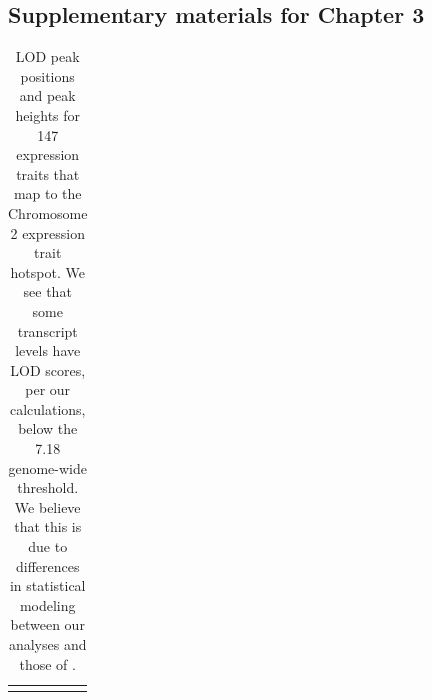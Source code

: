 \documentclass[oneside]{book}\usepackage[]{graphicx}\usepackage[]{color}
\begin{document}
\begin{appendices}
\chapter{Supplementary materials for Chapter 3}

{\small
\begin{longtable}{lrr}
\caption{LOD peak positions and peak heights for 147 expression traits that map to the Chromosome 2 expression trait hotspot. We see that some transcript levels have LOD scores, per our calculations, below the 7.18 genome-wide threshold. We believe that this is due to differences in statistical modeling between our analyses and those of \citet{keller2018genetic}.}\label{tab:chr2-hot}\\ 
\hline \\


\end{longtable}}
\end{appendices}
\end{document}
